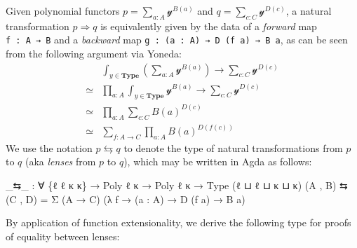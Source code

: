 \documentclass[
  11pt,
  oneside,
  article]{memoir}
\newenvironment{Shaded}{}{}
\newcommand{\NormalTok}[1]{#1}
\newcommand{\OtherTok}[1]{\textcolor[rgb]{0.00,0.44,0.13}{#1}}
\theoremstyle{definition}
\theoremstyle{plain}
\newcommand{\yon}{\mathcal{y}}
\newcommand{\0}{\textsf{0}}
\newcommand{\1}{\tn{\textsf{1}}}
\begin{document}
Given polynomial functors \(p = \sum_{a : A} \yon^{B(a)}\) and
\(q = \sum_{c : C} \yon^{D(c)}\), a natural transformation
\(p \Rightarrow q\) is equivalently given by the data of a
\emph{forward} map \texttt{f\ :\ A\ →\ B} and a \emph{backward} map
\texttt{g\ :\ (a\ :\ A)\ →\ D\ (f\ a)\ →\ B\ a}, as can be seen from the
following argument via Yoneda: \[
\begin{array}{rl}
& \int_{y \in \mathbf{Type}} \left( \sum_{a : A} \yon^{B(a)}  \right) \to \sum_{c : C} \yon^{D(c)}\\
\simeq & \prod_{a : A} \int_{y \in \mathbf{Type}} \yon^{B(a)} \to \sum_{c : C} \yon^{D(c)}\\
\simeq & \prod_{a : A} \sum_{c : C} B(a)^{D(c)}\\
\simeq & \sum_{f : A \to C} \prod_{a : A} B(a)^{D(f(c))}
\end{array}
\] We use the notation \(p \leftrightarrows q\) to denote the type of
natural transformations from \(p\) to \(q\) (aka \emph{lenses} from
\(p\) to \(q\)), which may be written in Agda as follows:

\begin{Shaded}
\begin{Highlighting}[]
\OtherTok{\_}\NormalTok{⇆}\OtherTok{\_} \OtherTok{:} \OtherTok{∀} \OtherTok{\{}\NormalTok{ℓ ℓ\textquotesingle{} κ κ\textquotesingle{}}\OtherTok{\}} \OtherTok{→}\NormalTok{ Poly ℓ κ }\OtherTok{→}\NormalTok{ Poly ℓ\textquotesingle{} κ\textquotesingle{} }\OtherTok{→}\NormalTok{ Type }\OtherTok{(}\NormalTok{ℓ ⊔ ℓ\textquotesingle{} ⊔ κ ⊔ κ\textquotesingle{}}\OtherTok{)}
\OtherTok{(}\NormalTok{A , B}\OtherTok{)}\NormalTok{ ⇆ }\OtherTok{(}\NormalTok{C , D}\OtherTok{)} \OtherTok{=}\NormalTok{ Σ }\OtherTok{(}\NormalTok{A }\OtherTok{→}\NormalTok{ C}\OtherTok{)} \OtherTok{(λ}\NormalTok{ f }\OtherTok{→} \OtherTok{(}\NormalTok{a }\OtherTok{:}\NormalTok{ A}\OtherTok{)} \OtherTok{→}\NormalTok{ D }\OtherTok{(}\NormalTok{f a}\OtherTok{)} \OtherTok{→}\NormalTok{ B a}\OtherTok{)}
\end{Highlighting}
\end{Shaded}

By application of function extensionality, we derive the following type
for proofs of equality between lenses:
\end{document}
